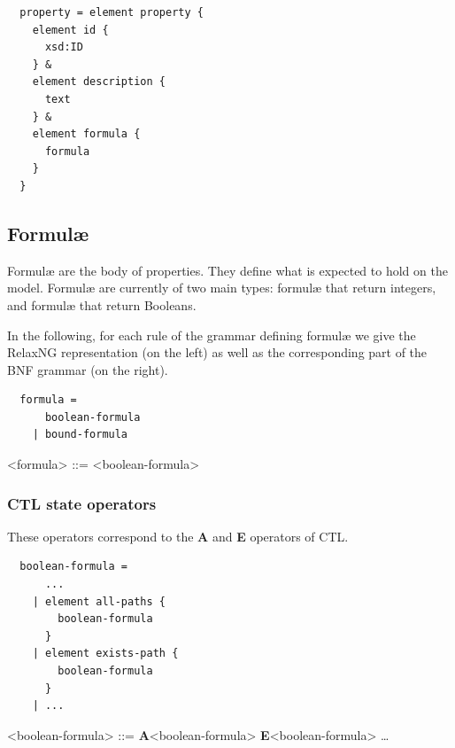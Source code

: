 \documentclass[10pt,english,a4paper]{article}
\newcommand\ctla             {\textbf{A}\xspace}
\newcommand\ctle             {\textbf{E}\xspace}
\newcommand\mysubsection[1]{\color{sectioncolor}\subsection{#1}\color{defaultcolor}}
\begin{document}

\begin{lstlisting}
  property = element property {
    element id {
      xsd:ID
    } &
    element description {
      text
    } &
    element formula {
      formula
    }
  }
\end{lstlisting}


\mysubsection{Formul{\ae}}
Formul{\ae} are the body of properties.
They define what is expected to hold on the model.
Formul\ae{} are currently of two main types: formul{\ae} that return integers, and formul{\ae}
that return Booleans.

In the following, for each rule of the grammar defining formulæ we give the
RelaxNG representation (on the left) as well as the corresponding part of
the BNF grammar (on the right).

\begin{multicols}{2}
\begin{lstlisting}
  formula =
      boolean-formula
    | bound-formula
\end{lstlisting}
\columnbreak
\begin{grammar}
<formula> ::= <boolean-formula>
\end{grammar}
\end{multicols}

\subsubsection{CTL state operators}

These operators correspond to the \ctla and \ctle operators of CTL.

\begin{multicols}{2}
\begin{lstlisting}
  boolean-formula =
      ...
    | element all-paths {
        boolean-formula
      }
    | element exists-path {
        boolean-formula
      }
    | ...
\end{lstlisting}
\columnbreak
\begin{grammar}
<boolean-formula> ::= \ctla <boolean-formula>
\alt \ctle <boolean-formula>
\alt \ldots
\end{grammar}
\end{multicols}
\end{document}
